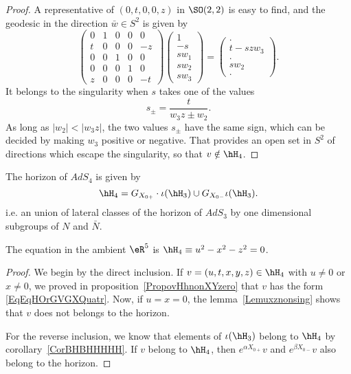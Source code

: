 \begin{proof}
A representative of $(0,t,0,0,z)$ in $\SO(2,2)$ is easy to find, and the geodesic in the direction $\bar w\in S^2$ is given by
\begin{equation}
	\begin{pmatrix}
 0	&	1	&	0	&	0	&	0\\
 t	&	0	&	0	&	0	&	-z\\
 0	&	0	&	1	&	0	&	0\\
 0	&	0	&	0	&	1	&	0\\
z	&	0	&	0	&	0	&	-t
 \end{pmatrix}
\begin{pmatrix}
	1	\\
	-s	\\
	sw_1	\\
	sw_2	\\
	sw_3
\end{pmatrix}=
\begin{pmatrix}
	.	\\
	t-szw_3	\\
	.	\\
	sw_2	\\
	.
\end{pmatrix}.
\end{equation}
It belongs to the singularity when $s$ takes one of the values
\begin{equation}
	s_{\pm}=\frac{ t }{ w_3z\pm w_2 }.
\end{equation}
As long as $|w_2|<|w_3z|$, the two values $s_{\pm}$ have the same sign, which can be decided by making $w_3$ positive or negative. That provides an open set in $S^2$ of directions which escape the singularity, so that $v\notin\hH_4$.
\end{proof}


\begin{theorem}			\label{ThoHorQuatreInclusionHorTrois}\label{ThoEqHorQCoore}
	The horizon of $AdS_4$ is given by
	\begin{equation}		\label{EqEqHOrGVGXQuatr}
		\hH_4=G_{X_{0+}}\cdot \iota(\hH_3)\cup G_{X_{0-}}\iota(\hH_3).
	\end{equation}
	i.e. an union of lateral classes of the horizon of $AdS_3$ by one dimensional subgroups of $N$ and $\bar N$.

	The equation in the ambient $\eR^5$ is $\hH_4\equiv u^2-x^2-z^2=0$.
\end{theorem}

\begin{proof}
	We begin by the direct inclusion. If $v=(u,t,x,y,z)\in\hH_4$ with $u\neq 0$ or $x\neq 0$, we proved in proposition~\ref{PropovHhnonXYzero} that $v$ has the form \eqref{EqEqHOrGVGXQuatr}. Now, if $u=x=0$, the lemma~\ref{Lemuxznonsing} shows that $v$ does not belongs to the horizon.

	For the reverse inclusion, we know that elements of $\iota(\hH_3)$ belong to $\hH_4$ by corollary~\ref{CorBHBHHHHH}. If $v$ belong to $\hH_4$, then $ e^{\alpha X_{0+}}v$ and $ e^{\beta X_{0-}}v$ also belong to the horizon.
\end{proof}

